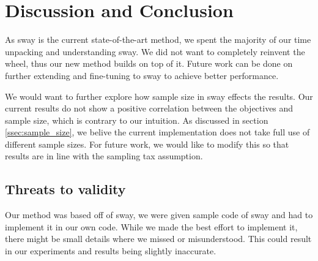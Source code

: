 \section{Discussion and Conclusion}
\label{sec:discussion}

  As sway is the current state-of-the-art method, we spent the majority
  of our time unpacking and understanding sway. We did not want to
  completely reinvent the wheel, thus our new method builds on top of
  it. Future work can be done on further extending and fine-tuning to
  sway to achieve better performance.

  We would want to further explore how sample size in sway effects the
  results. Our current results do not show a positive correlation
  between the objectives and sample size, which is contrary to our
  intuition. As discussed in section \ref{ssec:sample_size}, we belive
  the current implementation does not take full use of different sample
  sizes. For future work, we would like to modify this so that results
  are in line with the sampling tax assumption.

  \subsection{Threats to validity}
    Our method was based off of sway, we were given sample code of sway
    and had to implement it in our own code. While we made the best effort
    to implement it, there might be small details where we missed or
    misunderstood. This could result in our experiments and results being
    slightly inaccurate. 

  